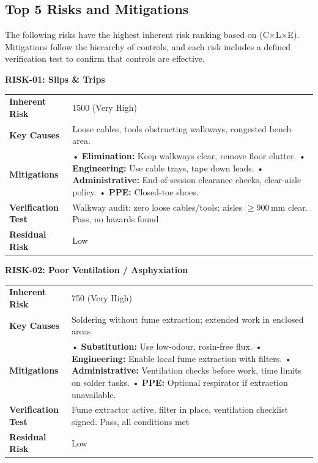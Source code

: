 \subsection{Top 5 Risks and Mitigations}

The following risks have the highest inherent risk ranking based on (C×L×E). Mitigations follow the hierarchy of controls, and each risk includes a defined verification test to confirm that controls are effective.

\textbf{RISK-01: Slips \& Trips}

\begin{tabular}{@{}p{3cm}p{13cm}@{}}
\toprule
\textbf{Inherent Risk} & 1500 (Very High) \\
\textbf{Key Causes} & Loose cables, tools obstructing walkways, congested bench area. \\
\textbf{Mitigations} &
• \textbf{Elimination:} Keep walkways clear, remove floor clutter. \newline
• \textbf{Engineering:} Use cable trays, tape down leads. \newline
• \textbf{Administrative:} End-of-session clearance checks, clear-aisle policy. \newline
• \textbf{PPE:} Closed-toe shoes. \\
\textbf{Verification Test} & Walkway audit: zero loose cables/tools; aisles $\geq$900\,mm clear. Pass, no hazards found \\
\textbf{Residual Risk} & Low \\
\bottomrule
\end{tabular}
\vspace{0.6em}

\pagebreak
\textbf{RISK-02: Poor Ventilation / Asphyxiation}

\begin{tabular}{@{}p{3cm}p{13cm}@{}}
\toprule
\textbf{Inherent Risk} & 750 (Very High) \\
\textbf{Key Causes} & Soldering without fume extraction; extended work in enclosed areas. \\
\textbf{Mitigations} &
• \textbf{Substitution:} Use low-odour, rosin-free flux. \newline
• \textbf{Engineering:} Enable local fume extraction with filters. \newline
• \textbf{Administrative:} Ventilation checks before work, time limits on solder tasks. \newline
• \textbf{PPE:} Optional respirator if extraction unavailable. \\
\textbf{Verification Test} & Fume extractor active, filter in place, ventilation checklist signed. Pass, all conditions met \\
\textbf{Residual Risk} & Low \\
\bottomrule
\end{tabular}
\vspace{0.6em}

